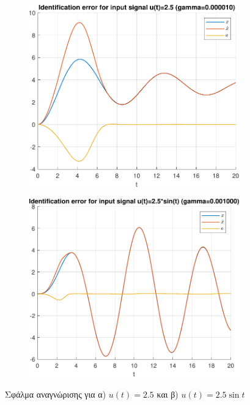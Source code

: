 \documentclass[a4paper,12pt]{article}
\begin{document}
\begin{figure}[h!]
    \centering
    \begin{subfigure}{0.45\textwidth}
        \centering
        \includegraphics[width=\linewidth]{plot/task1_identification_error_gradient_descend_1.pdf}
        \caption{}
        \label{fig:task1_identification_error_gradient_descend_1}
    \end{subfigure}
    \hfill
    \begin{subfigure}{0.45\textwidth}
        \centering
        \includegraphics[width=\linewidth]{plot/task1_identification_error_gradient_descend_2.pdf}
        \caption{}
        \label{fig:task1_identification_error_gradient_descend_2}
    \end{subfigure}
    \caption{Σφάλμα αναγνώρισης για α) $u(t) = 2.5$ και β) $u(t) = 2.5 \sin t$}
    \label{fig:task1_identification_error_gradient_descend}
\end{figure}
\end{document}

